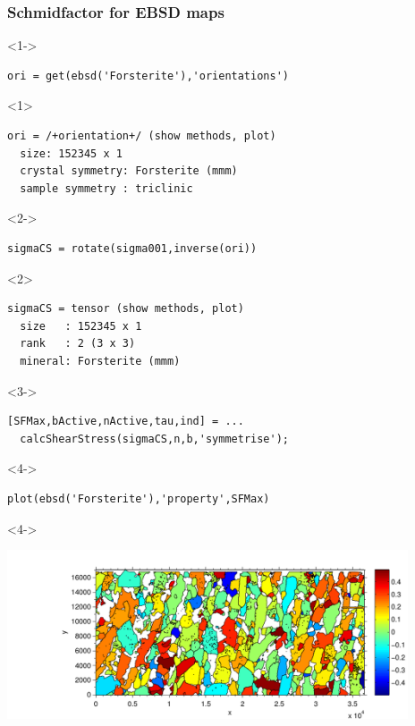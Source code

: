 \documentclass[compress]{beamer}
\begin{document}
\begin{frame}[fragile]
  \frametitle{Schmidfactor for EBSD maps}

    \begin{overlayarea}{\textwidth}{\textheight}
    \begin{onlyenv}<1->
      \vspace{-.5cm}
  \begin{lstlisting}[style=input]
ori = get(ebsd('Forsterite'),'orientations')
  \end{lstlisting}
  \vspace{-.3cm}
\end{onlyenv}
\begin{onlyenv}<1>
  \begin{lstlisting}[style=output]
ori = /+orientation+/ (show methods, plot)
  size: 152345 x 1
  crystal symmetry: Forsterite (mmm)
  sample symmetry : triclinic
  \end{lstlisting}
  \end{onlyenv}

  \begin{onlyenv}<2->
  \begin{lstlisting}[style=input]
sigmaCS = rotate(sigma001,inverse(ori))
  \end{lstlisting}
  \vspace{-.3cm}
\end{onlyenv}
\begin{onlyenv}<2>
  \begin{lstlisting}[style=output]
sigmaCS = tensor (show methods, plot)
  size   : 152345 x 1
  rank   : 2 (3 x 3)
  mineral: Forsterite (mmm)
  \end{lstlisting}
\end{onlyenv}
  \begin{onlyenv}<3->
\begin{lstlisting}[style=input]
[SFMax,bActive,nActive,tau,ind] = ...
  calcShearStress(sigmaCS,n,b,'symmetrise');
  \end{lstlisting}
  \vspace{-.3cm}
\end{onlyenv}
\begin{onlyenv}<4->
  \begin{lstlisting}[style=input]
plot(ebsd('Forsterite'),'property',SFMax)
  \end{lstlisting}
\end{onlyenv}

  \begin{onlyenv}<4->
    \centerline{
    \includegraphics[height=5cm]{pic/SFEBSD.pdf}}
\end{onlyenv}


\end{overlayarea}
\end{frame}
\end{document}
